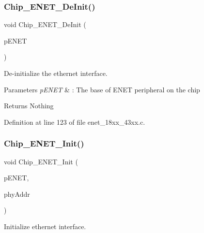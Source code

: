 \subsubsection{\texorpdfstring{Chip\+\_\+\+E\+N\+E\+T\+\_\+\+De\+Init()}{Chip\_ENET\_DeInit()}}
{\footnotesize\ttfamily void Chip\+\_\+\+E\+N\+E\+T\+\_\+\+De\+Init (\begin{DoxyParamCaption}\item[{\hyperlink{struct_l_p_c___e_n_e_t___t}{L\+P\+C\+\_\+\+E\+N\+E\+T\+\_\+T} $\ast$}]{p\+E\+N\+ET }\end{DoxyParamCaption})}



De-\/initialize the ethernet interface. 


\begin{DoxyParams}{Parameters}
{\em p\+E\+N\+ET} & \+: The base of E\+N\+ET peripheral on the chip \\
\hline
\end{DoxyParams}
\begin{DoxyReturn}{Returns}
Nothing 
\end{DoxyReturn}


Definition at line 123 of file enet\+\_\+18xx\+\_\+43xx.\+c.

\mbox{\label{group___e_n_e_t__18_x_x__43_x_x_ga99d0be52bb0716f996ec379d0000a0ae}} 
\subsubsection{\texorpdfstring{Chip\+\_\+\+E\+N\+E\+T\+\_\+\+Init()}{Chip\_ENET\_Init()}}
{\footnotesize\ttfamily void Chip\+\_\+\+E\+N\+E\+T\+\_\+\+Init (\begin{DoxyParamCaption}\item[{\hyperlink{struct_l_p_c___e_n_e_t___t}{L\+P\+C\+\_\+\+E\+N\+E\+T\+\_\+T} $\ast$}]{p\+E\+N\+ET,  }\item[{uint32\+\_\+t}]{phy\+Addr }\end{DoxyParamCaption})}



Initialize ethernet interface. 


